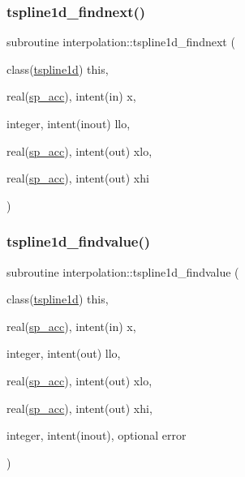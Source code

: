 \subsubsection{\texorpdfstring{tspline1d\+\_\+findnext()}{tspline1d\_findnext()}}
{\footnotesize\ttfamily subroutine interpolation\+::tspline1d\+\_\+findnext (\begin{DoxyParamCaption}\item[{class(\mbox{\hyperlink{structinterpolation_1_1tspline1d}{tspline1d}})}]{this,  }\item[{real(\mbox{\hyperlink{namespaceinterpolation_af72aa9a05feb8ef90b2d26e4a013abf3}{sp\+\_\+acc}}), intent(in)}]{x,  }\item[{integer, intent(inout)}]{llo,  }\item[{real(\mbox{\hyperlink{namespaceinterpolation_af72aa9a05feb8ef90b2d26e4a013abf3}{sp\+\_\+acc}}), intent(out)}]{xlo,  }\item[{real(\mbox{\hyperlink{namespaceinterpolation_af72aa9a05feb8ef90b2d26e4a013abf3}{sp\+\_\+acc}}), intent(out)}]{xhi }\end{DoxyParamCaption})}

\mbox{\label{namespaceinterpolation_ac80c6bb26b81ce989cad9b77fcbd66ab}} 
\subsubsection{\texorpdfstring{tspline1d\+\_\+findvalue()}{tspline1d\_findvalue()}}
{\footnotesize\ttfamily subroutine interpolation\+::tspline1d\+\_\+findvalue (\begin{DoxyParamCaption}\item[{class(\mbox{\hyperlink{structinterpolation_1_1tspline1d}{tspline1d}})}]{this,  }\item[{real(\mbox{\hyperlink{namespaceinterpolation_af72aa9a05feb8ef90b2d26e4a013abf3}{sp\+\_\+acc}}), intent(in)}]{x,  }\item[{integer, intent(out)}]{llo,  }\item[{real(\mbox{\hyperlink{namespaceinterpolation_af72aa9a05feb8ef90b2d26e4a013abf3}{sp\+\_\+acc}}), intent(out)}]{xlo,  }\item[{real(\mbox{\hyperlink{namespaceinterpolation_af72aa9a05feb8ef90b2d26e4a013abf3}{sp\+\_\+acc}}), intent(out)}]{xhi,  }\item[{integer, intent(inout), optional}]{error }\end{DoxyParamCaption})}

